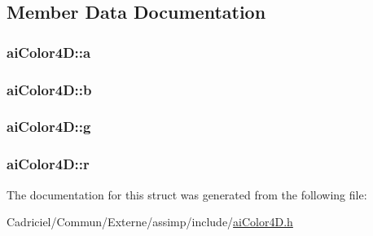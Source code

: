 \subsection{Member Data Documentation}
\hypertarget{structai_color4_d_a1bf4f719c14e844dcd7ce5a1c1969c89}{
\subsubsection[{a}]{ ai\-Color4\-D\-::a}}\label{structai_color4_d_a1bf4f719c14e844dcd7ce5a1c1969c89}
\hypertarget{structai_color4_d_ab64376fc730371f8952f5f98084b2430}{
\subsubsection[{b}]{ ai\-Color4\-D\-::b}}\label{structai_color4_d_ab64376fc730371f8952f5f98084b2430}
\hypertarget{structai_color4_d_a32e929c7db12fb6f79f74a611f6d8fe6}{
\subsubsection[{g}]{ ai\-Color4\-D\-::g}}\label{structai_color4_d_a32e929c7db12fb6f79f74a611f6d8fe6}
\hypertarget{structai_color4_d_a989c2117cfae5a4457fa65f0257e93c7}{
\subsubsection[{r}]{ ai\-Color4\-D\-::r}}\label{structai_color4_d_a989c2117cfae5a4457fa65f0257e93c7}


The documentation for this struct was generated from the following file\-:\begin{DoxyCompactItemize}
\item 
Cadriciel/\-Commun/\-Externe/assimp/include/\hyperlink{ai_color4_d_8h}{ai\-Color4\-D.\-h}\end{DoxyCompactItemize}
